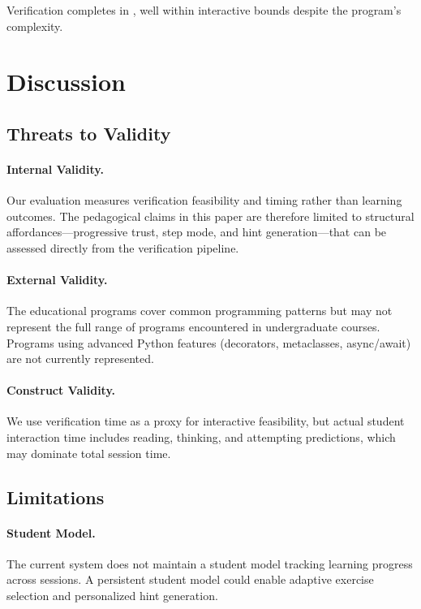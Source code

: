 \documentclass[11pt]{article}
\begin{document}
Verification completes in \ppLXVIedudesignpatternsTime{}, well within
interactive bounds despite the program's complexity.

\section{Discussion}\label{sec:discussion}

\subsection{Threats to Validity}

\paragraph{Internal Validity.}
Our evaluation measures verification feasibility and timing rather than
learning outcomes. The pedagogical claims in this paper are therefore limited
to structural affordances---progressive trust, step mode, and hint
generation---that can be assessed directly from the verification pipeline.

\paragraph{External Validity.}
The \ppLXVIprogramCount{} educational programs cover common programming
patterns but may not represent the full range of programs encountered in
undergraduate courses. Programs using advanced Python features (decorators,
metaclasses, async/await) are not currently represented.

\paragraph{Construct Validity.}
We use verification time as a proxy for interactive feasibility, but actual
student interaction time includes reading, thinking, and attempting
predictions, which may dominate total session time.

\subsection{Limitations}

\paragraph{Student Model.}
The current system does not maintain a student model tracking learning
progress across sessions. A persistent student model could enable
adaptive exercise selection and personalized hint generation.
\end{document}
